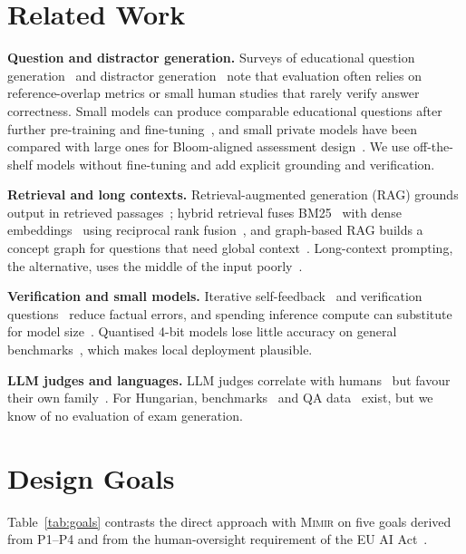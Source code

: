 \documentclass[conference]{IEEEtran}
\newcommand{\Mimir}{\textsc{Mimir}}
\begin{document}
\section{Related Work}

\textbf{Question and distractor generation.} Surveys of educational question
generation~\cite{kurdi2020systematic} and distractor generation~\cite{alhazmi2024distractor} note that
evaluation often relies on reference-overlap metrics or small human studies that rarely verify answer
correctness. Small models can produce comparable educational questions after further pre-training
and fine-tuning~\cite{fawzi2023small,fawzi2024towards}, and small private models have been compared
with large ones for Bloom-aligned assessment design~\cite{jaldi2026small}. We use off-the-shelf models
without fine-tuning and add explicit grounding and verification.

\textbf{Retrieval and long contexts.} Retrieval-augmented generation (RAG) grounds output in retrieved
passages~\cite{lewis2020rag}; hybrid retrieval fuses BM25~\cite{robertson2009bm25} with dense
embeddings~\cite{wang2024me5} using reciprocal rank fusion~\cite{cormack2009rrf}, and graph-based
RAG builds a concept graph for questions that need global context~\cite{edge2024graphrag}. Long-context
prompting, the alternative, uses the middle of the input poorly~\cite{liu2024lost}.

\textbf{Verification and small models.} Iterative self-feedback~\cite{madaan2023selfrefine} and
verification questions~\cite{dhuliawala2024cove} reduce factual errors, and spending inference compute
can substitute for model size~\cite{snell2025scaling}. Quantised 4-bit models lose little accuracy on
general benchmarks~\cite{li2024evalquant,kurtic2025bf16}, which makes local deployment plausible.

\textbf{LLM judges and languages.} LLM judges correlate with humans~\cite{zheng2023judge} but favour
their own family~\cite{panickssery2024selfpref}. For Hungarian, benchmarks~\cite{ligetinagy2024hulu}
and QA data~\cite{novak2023milqa} exist, but we know of no evaluation of exam generation.

\section{Design Goals}

Table~\ref{tab:goals} contrasts the direct approach with \Mimir{} on five goals derived from P1--P4 and
from the human-oversight requirement of the EU AI Act~\cite{aiact2024}.
\end{document}
